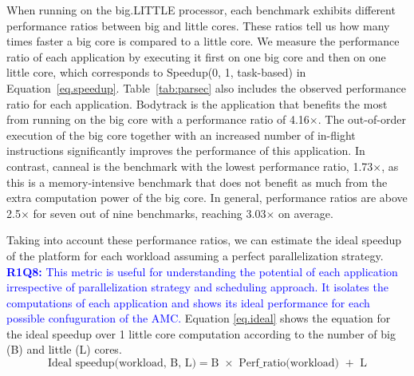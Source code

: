 
When running on the big.LITTLE processor, each benchmark exhibits different performance ratios between big and little cores. These ratios tell us how many times faster a big core is compared to a little core. We measure the performance ratio of each application by executing it first on one big core and then on one little core, which corresponds to Speedup(0, 1, task-based) in Equation~\ref{eq.speedup}. 
Table~\ref{tab:parsec} also includes the observed performance ratio for each application. Bodytrack is the application that benefits the most from running on the big core with a performance ratio of 4.16$\times$. The out-of-order execution of the big core together with an increased number of in-flight instructions significantly improves the performance of this application. In contrast, canneal is the benchmark with the lowest performance ratio, 1.73$\times$, as this is a memory-intensive benchmark that does not benefit as much from the extra computation power of the big core. In general, performance ratios are above 2.5$\times$ for seven out of nine benchmarks, reaching 3.03$\times$ on average. 


Taking into account these performance ratios, we can estimate the ideal speedup of the platform for each workload assuming a perfect parallelization strategy. 
\textcolor{blue}{
\textbf{R1Q8:} This metric is useful for understanding the potential of each application irrespective of parallelization strategy and scheduling approach. 
It isolates the computations of each application and shows its ideal performance for each possible confuguration of the AMC.
}
Equation \ref{eq.ideal} shows the equation for the ideal speedup over 1 little core computation according to the number of big (B) and little (L) cores.
\begingroup\makeatletter\def\f@size{8}\check@mathfonts
\begin{equation}
  \text{Ideal speedup(workload, B, L)} = \text{B $\times$ Perf\_ratio(workload) $+$ L}
\label{eq.ideal}
\end{equation}
\endgroup


